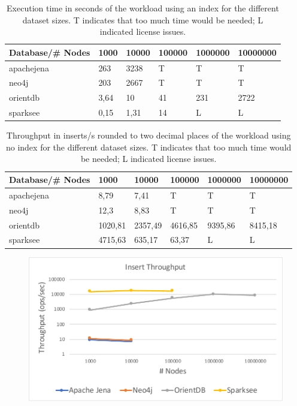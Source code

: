 \begin{table}[h!]
  \begin{minipage}{\textwidth}
    \centering
    \begin{tabularx}{\textwidth}{ | l | X | X | X | X | X | }
      \hline
      Database/\# Nodes & 1000 & 10000 & 100000 & 1000000 & 10000000 \\ \hline
      apachejena & 263 & 3238 & T & T & T \\ \hline
      neo4j & 203 & 2667 & T & T & T \\ \hline
      orientdb & 3,64 & 10 & 41 & 231 & 2722 \\ \hline
      sparksee & 0,15 & 1,31 & 14 & L & L \\ \hline
    \end{tabularx}
  \end{minipage}
  \caption{Execution time in seconds of the workload using an index for the different dataset sizes. T indicates that too much time would be needed; L indicated license issues.}
  \label{tab:withIndexExecutionTime}
\end{table}

\begin{table}[h!]
  \begin{minipage}{\textwidth}
    \centering
    \begin{tabularx}{\textwidth}{ | l | X | X | X | X | X | }
      \hline
      Database/\# Nodes & 1000 & 10000 & 100000 & 1000000 & 10000000 \\ \hline
      apachejena & 8,79 & 7,41 & T & T & T \\ \hline
      neo4j & 12,3 & 8,83 & T & T & T \\ \hline
      orientdb & 1020,81 & 2357,49 & 4616,85 & 9395,86 & 8415,18 \\ \hline
      sparksee & 4715,63 & 635,17 & 63,37 & L & L \\ \hline
    \end{tabularx}
  \end{minipage}
  \caption{Throughput in inserts/s rounded to two decimal places of the workload using no index for the different dataset sizes. T indicates that too much time would be needed; L indicated license issues.}
  \label{tab:withoutIndexThroughput}
\end{table}

\begin{figure}[h!]
  \centering
  \includegraphics[width=.75\textwidth]{images/throughput/withIndexThroughput}
  \label{fig:withIndexThroughput}
\end{figure}

